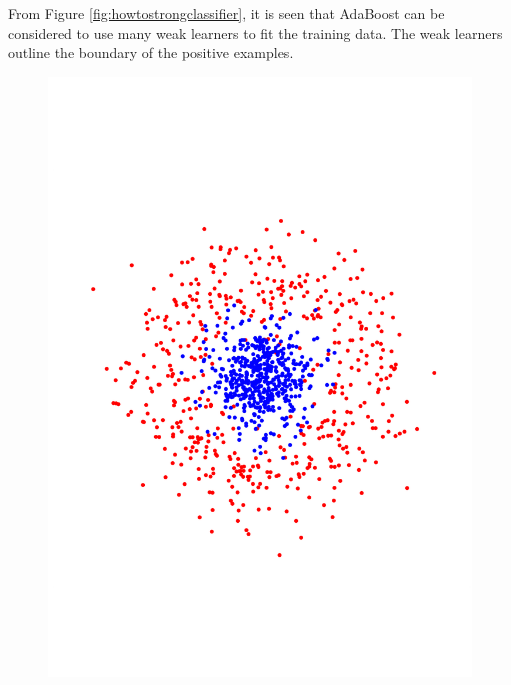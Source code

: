 From \mbox{Figure} \ref{fig:howtostrongclassifier}, it is seen that AdaBoost can be considered to use many weak learners to fit the training data. The weak learners outline the boundary of the positive examples. 
\begin{figure}
\begin{center}
 \includegraphics[angle=270, scale=0.166]{ch4/figures/56.pdf}

\end{center}
\end{figure}
